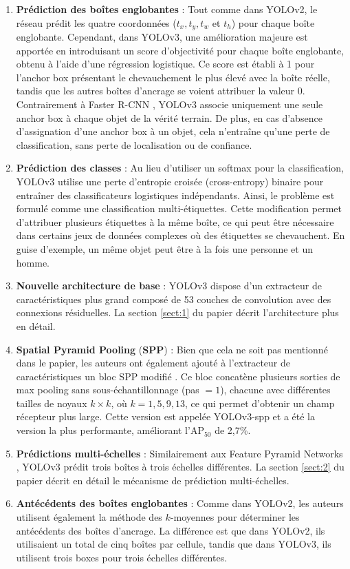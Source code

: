\documentclass{article}
\begin{document}
\begin{enumerate}
    \item \textbf{Prédiction des boîtes englobantes} : Tout comme dans YOLOv2, le réseau prédit les quatre coordonnées ($t_x, t_y, t_w$ et $t_h$) pour chaque boîte englobante. Cependant, dans YOLOv3, une amélioration majeure est apportée en introduisant un score d'objectivité pour chaque boîte englobante, obtenu à l'aide d'une régression logistique. Ce score est établi à 1 pour l'anchor box présentant le chevauchement le plus élevé avec la boîte réelle, tandis que les autres boîtes d'ancrage se voient attribuer la valeur 0. Contrairement à Faster R-CNN \cite{45}, YOLOv3 associe uniquement une seule anchor box à chaque objet de la vérité terrain. De plus, en cas d'absence d'assignation d'une anchor box à un objet, cela n'entraîne qu'une perte de classification, sans perte de localisation ou de confiance.
    \item \textbf{Prédiction des classes} : Au lieu d'utiliser un softmax pour la classification, YOLOv3 utilise une perte d'entropie croisée (cross-entropy) binaire pour entraîner des classificateurs logistiques indépendants. Ainsi, le problème est formulé comme une classification multi-étiquettes. Cette modification permet d'attribuer plusieurs étiquettes à la même boîte, ce qui peut être nécessaire dans certains jeux de données complexes \cite{47} où des étiquettes se chevauchent. En guise d'exemple, un même objet peut être à la fois une personne et un homme.
    \item \textbf{Nouvelle architecture de base} : YOLOv3 dispose d'un extracteur de caractéristiques plus grand composé de 53 couches de convolution avec des connexions résiduelles. La section \ref{sect:1} du papier décrit l'architecture plus en détail.
    \item \textbf{Spatial Pyramid Pooling} (\textbf{SPP}) : Bien que cela ne soit pas mentionné dans le papier, les auteurs ont également ajouté à l'extracteur de caractéristiques un bloc SPP modifié \cite{48} . Ce bloc concatène plusieurs sorties de max pooling sans sous-échantillonnage (pas $= 1$), chacune avec différentes tailles de noyaux $k \times k$, où $k = 1, 5, 9, 13$, ce qui permet d'obtenir un champ récepteur plus large. Cette version est appelée YOLOv3-spp et a été la version la plus performante, améliorant l'{AP$_{50}$} de 2,7\%.
    \item \textbf{Prédictions multi-échelles} : Similairement aux Feature Pyramid Networks \cite{49}, YOLOv3 prédit trois boîtes à trois échelles différentes. La section \ref{sect:2} du papier décrit en détail le mécanisme de prédiction multi-échelles.
    \item \textbf{Antécédents des boîtes englobantes} : Comme dans YOLOv2, les auteurs utilisent également la méthode des $k$-moyennes pour déterminer les antécédents des boîtes d'ancrage. La différence est que dans YOLOv2, ils utilisaient un total de cinq boîtes par cellule, tandis que dans YOLOv3, ils utilisent trois boxes pour trois échelles différentes.
\end{enumerate}
\end{document}
